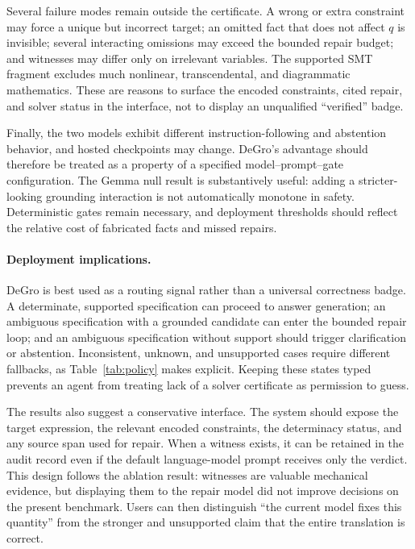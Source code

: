 \documentclass[sigconf,anonymous]{aamas}
\begin{document}
Several failure modes remain outside the certificate.  A wrong or extra constraint may force a unique but incorrect target; an omitted fact that does not affect $q$ is invisible; several interacting omissions may exceed the bounded repair budget; and witnesses may differ only on irrelevant variables.  The supported SMT fragment excludes much nonlinear, transcendental, and diagrammatic mathematics.  These are reasons to surface the encoded constraints, cited repair, and solver status in the interface, not to display an unqualified ``verified'' badge.

Finally, the two models exhibit different instruction-following and abstention behavior, and hosted checkpoints may change.  DeGro's advantage should therefore be treated as a property of a specified model--prompt--gate configuration.  The Gemma null result is substantively useful: adding a stricter-looking grounding interaction is not automatically monotone in safety.  Deterministic gates remain necessary, and deployment thresholds should reflect the relative cost of fabricated facts and missed repairs.

\paragraph{Deployment implications.}
DeGro is best used as a routing signal rather than a universal correctness badge.  A determinate, supported specification can proceed to answer generation; an ambiguous specification with a grounded candidate can enter the bounded repair loop; and an ambiguous specification without support should trigger clarification or abstention.  Inconsistent, unknown, and unsupported cases require different fallbacks, as Table~\ref{tab:policy} makes explicit.  Keeping these states typed prevents an agent from treating lack of a solver certificate as permission to guess.

The results also suggest a conservative interface.  The system should expose the target expression, the relevant encoded constraints, the determinacy status, and any source span used for repair.  When a witness exists, it can be retained in the audit record even if the default language-model prompt receives only the verdict.  This design follows the ablation result: witnesses are valuable mechanical evidence, but displaying them to the repair model did not improve decisions on the present benchmark.  Users can then distinguish ``the current model fixes this quantity'' from the stronger and unsupported claim that the entire translation is correct.
\end{document}
